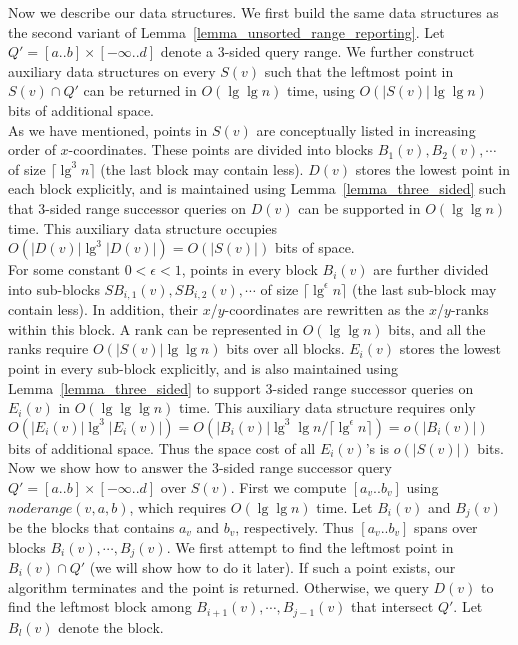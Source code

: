 \documentclass{llncs}
\begin{document}
\indent Now we describe our data structures.
We first build the same data structures as the second variant of Lemma~\ref{lemma_unsorted_range_reporting}.
Let $Q' = [a..b]\times[-\infty..d]$ denote a 3-sided query range.
We further construct auxiliary data structures on every $S(v)$ such that
the leftmost point in $S(v) \cap Q'$ can be returned in $O(\lg\lg n)$ time, using $O(|S(v)|\lg\lg n)$ bits of additional space. \\
\indent As we have mentioned, points in $S(v)$ are conceptually listed in increasing order of $x$-coordinates.
These points are divided into blocks $B_1(v), B_2(v), \cdots$ of size $\lceil \lg^3 n\rceil$ (the last block may contain less).
$D(v)$ stores the lowest point in each block explicitly,
and is maintained using Lemma~\ref{lemma_three_sided} such that 3-sided range successor queries on $D(v)$ can be supported in $O(\lg\lg n)$ time.
This auxiliary data structure occupies $O(|D(v)|\lg^3 |D(v)|) = O(|S(v)|)$ bits of space. \\
\indent For some constant $0 < \epsilon < 1$, points in every block $B_i(v)$ are further divided into sub-blocks
$SB_{i,1}(v), SB_{i,2}(v), \cdots$ of size $\lceil \lg^\epsilon n \rceil$ (the last sub-block may contain less).
In addition, their $x$/$y$-coordinates are rewritten as the $x$/$y$-ranks within this block.
A rank can be represented in $O(\lg\lg n)$ bits, and all the ranks require $O(|S(v)|\lg\lg n)$ bits over all blocks.
$E_i(v)$ stores the lowest point in every sub-block explicitly,
and is also maintained using Lemma~\ref{lemma_three_sided} to support 3-sided range successor queries on $E_i(v)$ in $O(\lg\lg\lg n)$ time.
This auxiliary data structure requires only $O(|E_i(v)|\lg^3 |E_i(v)|) = O(|B_i(v)|\lg^3\lg n / \lceil \lg^\epsilon n \rceil) = o(|B_i(v)|)$
bits of additional space.
Thus the space cost of all $E_i(v)$'s is $o(|S(v)|)$ bits. \\
\indent Now we show how to answer the 3-sided range successor query $Q' = [a..b]\times[-\infty..d]$ over $S(v)$.
First we compute $[a_v..b_v]$ using $noderange(v, a, b)$, which requires $O(\lg\lg n)$ time.
Let $B_i(v)$ and $B_j(v)$ be the blocks that contains $a_v$ and $b_v$, respectively.
Thus $[a_v..b_v]$ spans over blocks $B_i(v), \cdots, B_j(v)$.
We first attempt to find the leftmost point in $B_i(v) \cap Q'$ (we will show how to do it later).
If such a point exists, our algorithm terminates and the point is returned.
Otherwise, we query $D(v)$ to find the leftmost block among $B_{i+1}(v), \cdots, B_{j-1}(v)$ that intersect $Q'$.
Let $B_l(v)$ denote the block.
\end{document}
